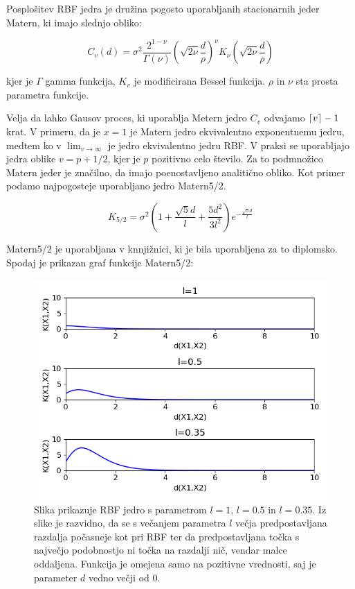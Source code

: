 \documentclass[a4paper, 12pt]{book}
\DeclarePairedDelimiter{\ceil}{\lceil}{\rceil}
\begin{document}
\par Posplošitev RBF jedra je družina pogosto uporabljanih stacionarnih jeder Matern, ki imajo slednjo obliko:

\begin{equation}
	C_v(d) = \sigma^2\frac{2^{1-\nu}}{\Gamma(\nu)}{(\sqrt{2\nu}\frac{d}{\rho})}^\nu K_\nu (\sqrt{2\nu}\frac{d}{\rho})
\end{equation}

kjer je $\Gamma$ gamma funkcija, $K_v$ je modificirana Bessel funkcija.
$\rho$ in $\nu$ sta prosta parametra funkcije.

Velja da lahko Gausov proces, ki uporablja Metern jedro $C_v$ odvajamo $\ceil{v} - 1$ krat.
V primeru, da je $x = 1$ je Matern jedro ekvivalentno exponentnemu jedru, medtem ko v $\lim_{v \to \infty}$ je jedro ekvivalentno jedru RBF.
V praksi se uporabljajo jedra oblike $v = p + 1/2$, kjer je $p$ pozitivno celo število.
Za to podmnožico Matern jeder je značilno, da imajo poenostavljeno analitično obliko.
Kot primer podamo najpogosteje uporabljano jedro Matern5/2.

\begin{equation}
	K_{5/2} = \sigma^2 (1 + \frac{\sqrt{5}d}{l} + \frac{5d^2}{3l^2})e^{-\frac{\sqrt{5}d}{l}}
\end{equation}

Matern5/2 je uporabljana v knnjižnici, ki je bila uporabljena za to diplomsko.
Spodaj je prikazan graf funkcije Matern5/2: 

\begin{figure}[H]
\centerline{\includegraphics[height=0.6\textwidth]{images/matern}}
\caption{Slika prikazuje RBF jedro s parametrom $l=1$, $l=0.5$ in $l=0.35$. 
Iz slike je razvidno, da se s večanjem parametra $l$ večja predpostavljana razdalja  počasneje kot pri RBF ter da predpostavljana točka s največjo podobnostjo ni točka na razdalji nič, vendar malce oddaljena.
Funkcija je omejena samo na pozitivne vrednosti, saj je parameter $d$ vedno večji od 0.}
\label{Matern5/2 jedro}
\end{figure}
\end{document}
